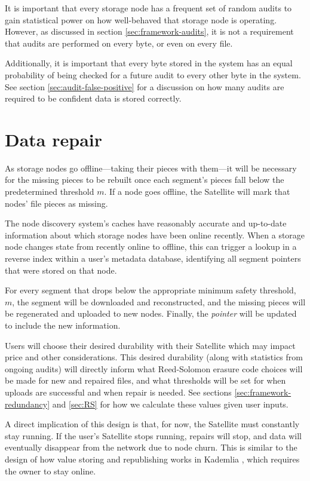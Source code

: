 \documentclass[8pt,fleqn,openany]{book}
\begin{document}
It is important that every storage node has a frequent set of random audits to
gain statistical power on how well-behaved that storage node is operating.
However, as discussed in section \ref{sec:framework-audits}, it is
not a requirement that audits are performed on every byte, or even on every
file.

Additionally, it is important that every byte stored in the system has an equal
probability of being checked for a future audit to every other byte in the
system. See section \ref{sec:audit-false-positive} for a discussion on
how many audits are required to be confident data is stored correctly.

\section{Data repair}\label{sec:concrete-data-repair}

As storage nodes go offline---taking their pieces with them---it will
be necessary for the missing pieces to be rebuilt once each segment's pieces
fall below the predetermined threshold $m$. If a node goes offline, the
Satellite will mark that nodes' file pieces as missing.

The node discovery system's caches have reasonably accurate and
up-to-date information about which storage nodes have been online recently.
When a storage node changes state from recently online to offline, this can
trigger a lookup in a reverse index within a user's metadata database,
identifying all segment pointers that were stored on that node.

For every segment that drops below the appropriate minimum safety
threshold, $m$, the segment will be downloaded and reconstructed, and the
missing pieces will be regenerated and uploaded to new nodes. Finally, the
{\em pointer} will be updated to include the new information.

Users will choose their desired durability with their Satellite
which may impact price and other considerations. This desired durability (along with
statistics from ongoing audits) will directly inform what Reed-Solomon erasure
code choices will be made for new and repaired files, and what thresholds
will be set for when uploads are successful and when repair is needed. See
sections \ref{sec:framework-redundancy} and \ref{sec:RS} for how we calculate
these values given user inputs.

A direct implication of this design is that, for now, the Satellite must
constantly stay running. If the user's Satellite stops running, repairs will
stop, and data will eventually disappear from the network due to node churn.
This is similar to the design of how value storing and republishing works in
Kademlia \cite{kad}, which requires the owner to stay online.
\end{document}
